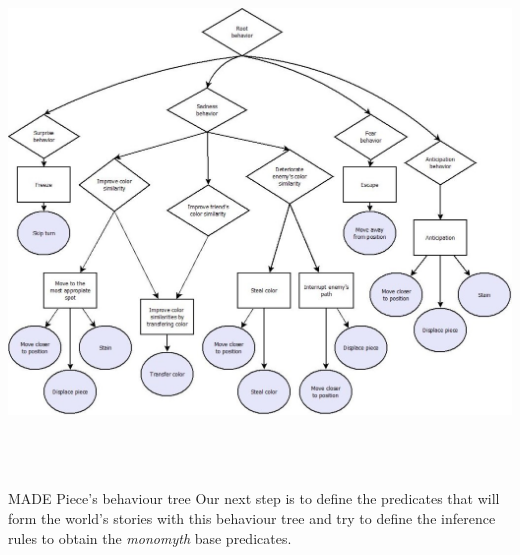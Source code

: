 \documentclass[a4paper]{article}
\newcommand\textstyleEmphasis[1]{\textit{#1}}
\begin{document}
\href{http://www.velonuboso.com/made/blog/wp-content/uploads/2015/07/piece_behaviour_tree_1.jpg}{
\includegraphics[width=16.955cm,height=13.702cm]{makingofmade113-img18.jpg}
}

MADE Piece{\textquoteright}s behaviour tree
Our next step is to define the predicates that will form the
world{\textquoteright}s stories with this behaviour tree and try to
define the inference rules to obtain the \textstyleEmphasis{monomyth}
base predicates.
\end{document}
